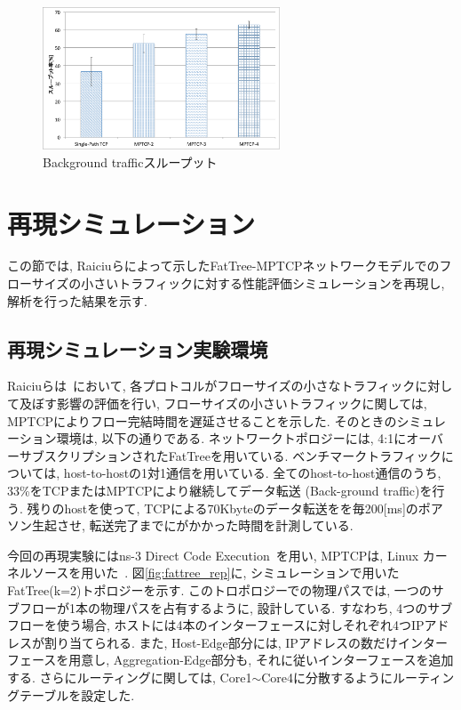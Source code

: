 \begin{figure}[t]
    \begin{center}
    \includegraphics[autoebb, width=200pt]{./img/back.pdf}
    \caption{Background trafficスループット}
    \label{fig:background}
    \end{center}
\end{figure}
\hspace{1cm}


\section{再現シミュレーション}
この節では, Raiciuらによって示したFatTree-MPTCPネットワークモデルでのフローサイズの小さいトラフィックに対する性能評価シミュレーションを再現し,
解析を行った結果を示す.

\subsection{再現シミュレーション実験環境}
Raiciuらは~\cite{improving}において, 各プロトコルがフローサイズの小さなトラフィックに対して及ぼす影響の評価を行い,
フローサイズの小さいトラフィックに関しては, MPTCPによりフロー完結時間を遅延させることを示した.
そのときのシミュレーション環境は, 以下の通りである.
ネットワークトポロジーには, 4:1にオーバーサブスクリプションされたFatTreeを用いている.
ベンチマークトラフィックについては, host-to-hostの1対1通信を用いている.
全てのhost-to-host通信のうち, 33\%をTCPまたはMPTCPにより継続してデータ転送 (Back-ground traffic)を行う.
残りのhostを使って, TCPによる70Kbyteのデータ転送をを毎200[ms]のポアソン生起させ, 転送完了までにがかかった時間を計測している.

今回の再現実験にはns-3 Direct Code Execution~\cite{ns3}を用い, MPTCPは, Linux
カーネルソースを用いた~\cite{mptcp_linux}.
図\ref{fig:fattree_rep}に, シミュレーションで用いたFatTree(k=2)トポロジーを示す.
このトロポロジーでの物理パスでは, 一つのサブフローが1本の物理パスを占有するように, 設計している.
すなわち, 4つのサブフローを使う場合, ホストには4本のインターフェースに対しそれぞれ4つIPアドレスが割り当てられる.
また, Host-Edge部分には, IPアドレスの数だけインターフェースを用意し, Aggregation-Edge部分も,
それに従いインターフェースを追加する.
さらにルーティングに関しては, Core1$\sim$Core4に分散するようにルーティングテーブルを設定した.

